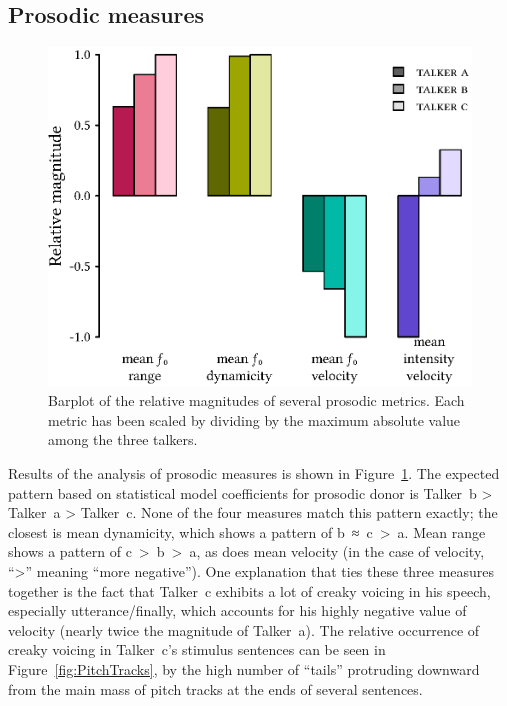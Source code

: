 
\subsection{Prosodic measures}
\begin{figure}
	\begin{centering}
	\includegraphics{figures/posthocs/ProsodicMeasures.eps}
	\caption[Barplot of prosodic metrics]{Barplot of the relative magnitudes of several prosodic metrics. Each metric has been scaled by dividing by the maximum absolute value among the three talkers.\label{fig:ProsodicMeasures}}
	\end{centering}
\end{figure}

Results of the \ph{} analysis of prosodic measures is shown in Figure~\ref{fig:ProsodicMeasures}.  The expected pattern based on statistical model coefficients for prosodic donor is Talker~\ac{b} > Talker~\ac{a} > Talker~\ac{c}.  None of the four measures match this pattern exactly; the closest is mean \fo{} dynamicity, which shows a pattern of \ac{b}~≈~\ac{c}~>~\ac{a}.  Mean \fo{} range shows a pattern of \ac{c}~>~\ac{b}~>~\ac{a}, as does mean \fo{} velocity (in the case of velocity, “>” meaning “more negative”).\footnotemark{}  One explanation that ties these three measures together is the fact that Talker~\ac{c} exhibits a lot of creaky voicing in his speech, especially utterance\-/finally, which accounts for his highly negative value of \fo{} velocity (nearly twice the magnitude of Talker~\ac{a}).  The relative occurrence of creaky voicing in Talker~\ac{c}’s stimulus sentences can be seen in Figure~\ref{fig:PitchTracks}, by the high number of “tails” protruding downward from the main mass of pitch tracks at the ends of several sentences.

